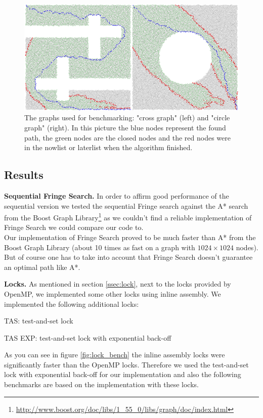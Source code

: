 \documentclass[letterpaper]{article}
\newcommand{\mypar}[1]{{\bf #1.}}
\begin{document}
\begin{figure}[h]\centering
  \includegraphics[scale=0.3]{benchmark_graphs.eps}
  \caption{The graphs used for benchmarking: "cross graph" (left) and "circle graph" (right). In this picture the blue nodes represent the found path, the green nodes are the closed nodes and the red nodes were in the nowlist or laterlist when the algorithm finished. \label{fig:graphs}}
\end{figure}

\subsection{Results}\label{ssec:results}

\mypar{Sequential Fringe Search}
In order to affirm good performance of the sequential version we tested the sequential Fringe search against the A* search from the Boost Graph Library\footnote{\url{http://www.boost.org/doc/libs/1_55_0/libs/graph/doc/index.html}} as we couldn't find a reliable implementation of Fringe Search we could compare our code to.\\
Our implementation of Fringe Search proved to be much faster than A* from the Boost Graph Library (about 10 times as fast on a graph with $1024 \times 1024$ nodes). But of course one has to take into account that Fringe Search doesn't guarantee an optimal path like A*.

\mypar{Locks}
As mentioned in section \ref{ssec:lock}, next to the locks provided by OpenMP, we implemented some other locks using inline assembly. We implemented the following additional locks:
\begin{compactitem}
\item TAS: test-and-set lock
\item TAS EXP: test-and-set lock with exponential back-off
\end{compactitem}
As you can see in figure \ref{fig:lock_bench} the inline assembly locks were significantly faster than the OpenMP locks. Therefore we used the test-and-set lock with exponential back-off for our implementation and also the following benchmarks are based on the implementation with these locks.
\end{document}
